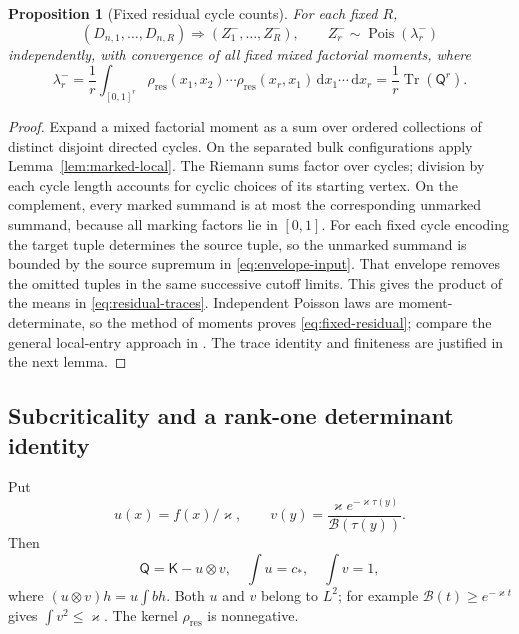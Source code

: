 \documentclass[11pt]{article}
\numberwithin{equation}{section}
\newtheorem{proposition}[theorem]{Proposition}
\theoremstyle{definition}
\theoremstyle{remark}
\newcommand{\dd}{\,\mathrm d}
\newcommand{\Pois}{\operatorname{Pois}}
\newcommand{\Tr}{\operatorname{Tr}}
\newcommand{\cB}{\mathcal B}
\newcommand{\Kop}{\mathsf K}
\newcommand{\Qop}{\mathsf Q}
\begin{document}
\begin{proposition}[Fixed residual cycle counts]\label{prop:marked-cycles}
For each fixed $R$,
\begin{equation}\label{eq:fixed-residual}
 (D_{n,1},\ldots,D_{n,R})\Rightarrow(Z_1^-,\ldots,Z_R^-),
 \qquad Z_r^-\sim\Pois(\lambda_r^-)
\end{equation}
independently, with convergence of all fixed mixed factorial moments, where
\begin{equation}\label{eq:residual-traces}
 \lambda_r^-=\frac1r\int_{[0,1]^r}\rho_{\mathrm{res}}(x_1,x_2)\cdots \rho_{\mathrm{res}}(x_r,x_1)
 \dd x_1\cdots\dd x_r=\frac1r\Tr(\Qop^r).
\end{equation}
\end{proposition}
\begin{proof}
Expand a mixed factorial moment as a sum over ordered collections of distinct disjoint directed cycles. On the separated bulk configurations apply Lemma~\ref{lem:marked-local}. The Riemann sums factor over cycles; division by each cycle length accounts for cyclic choices of its starting vertex. On the complement, every marked summand is at most the corresponding unmarked summand, because all marking factors lie in $[0,1]$. For each fixed cycle encoding the target tuple determines the source tuple,
so the unmarked summand is bounded by the source supremum in
\eqref{eq:envelope-input}. That envelope removes the omitted tuples in the
same successive cutoff limits. This gives the product of the means in \eqref{eq:residual-traces}. Independent Poisson laws are moment-determinate, so the method of moments proves \eqref{eq:fixed-residual}; compare the general local-entry approach in \cite{Mukherjee}. The trace identity and finiteness are justified in the next lemma.
\end{proof}

\subsection{Subcriticality and a rank-one determinant identity}
Put
\begin{equation}\label{eq:rank-one}
 u(x)=f(x)/\varkappa,\qquad
 v(y)=\frac{\varkappa e^{-\varkappa\tau(y)}}{\cB(\tau(y))}.
\end{equation}
Then
\[
 \Qop=\Kop-u\otimes v,\quad
 \int u=c_*,\quad \int v=1,
\]
where $(u\otimes v)h=u\int bh$. Both $u$ and $v$ belong to $L^2$; for example $\cB(t)\ge e^{-\varkappa t}$ gives $\int v^2\le\varkappa$. The kernel $\rho_{\mathrm{res}}$ is nonnegative.
\end{document}
